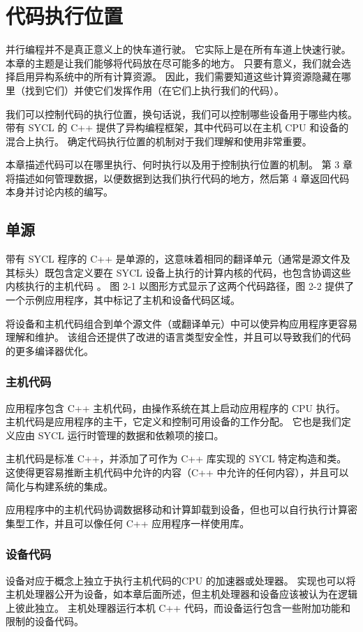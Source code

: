 \section{代码执行位置}
并行编程并不是真正意义上的快车道行驶。 它实际上是在所有车道上快速行驶。 本章的主题是让我们能够将代码放在尽可能多的地方。 只要有意义，我们就会选择启用异构系统中的所有计算资源。 因此，我们需要知道这些计算资源隐藏在哪里（找到它们）并使它们发挥作用（在它们上执行我们的代码）。

我们可以控制代码的执行位置，换句话说，我们可以控制哪些设备用于哪些内核。 带有 SYCL 的 C++ 提供了异构编程框架，其中代码可以在主机 CPU 和设备的混合上执行。 确定代码执行位置的机制对于我们理解和使用非常重要。

本章描述代码可以在哪里执行、何时执行以及用于控制执行位置的机制。 第 3 章将描述如何管理数据，以便数据到达我们执行代码的地方，然后第 4 章返回代码本身并讨论内核的编写。


\subsection{单源}
带有 SYCL 程序的 C++ 是单源的，这意味着相同的翻译单元（通常是源文件及其标头）既包含定义要在 SYCL 设备上执行的计算内核的代码，也包含协调这些内核执行的主机代码 。 图 2-1 以图形方式显示了这两个代码路径，图 2-2 提供了一个示例应用程序，其中标记了主机和设备代码区域。

将设备和主机代码组合到单个源文件（或翻译单元）中可以使异构应用程序更容易理解和维护。 该组合还提供了改进的语言类型安全性，并且可以导致我们的代码的更多编译器优化。

\subsubsection{主机代码}
应用程序包含 C++ 主机代码，由操作系统在其上启动应用程序的 CPU 执行。 主机代码是应用程序的主干，它定义和控制可用设备的工作分配。 它也是我们定义应由 SYCL 运行时管理的数据和依赖项的接口。

主机代码是标准 C++，并添加了可作为 C++ 库实现的 SYCL 特定构造和类。 这使得更容易推断主机代码中允许的内容（C++ 中允许的任何内容），并且可以简化与构建系统的集成。

应用程序中的主机代码协调数据移动和计算卸载到设备，但也可以自行执行计算密集型工作，并且可以像任何 C++ 应用程序一样使用库。

\subsubsection{设备代码}
设备对应于概念上独立于执行主机代码的CPU 的加速器或处理器。 实现也可以将主机处理器公开为设备，如本章后面所述，但主机处理器和设备应该被认为在逻辑上彼此独立。 主机处理器运行本机 C++ 代码，而设备运行包含一些附加功能和限制的设备代码。

